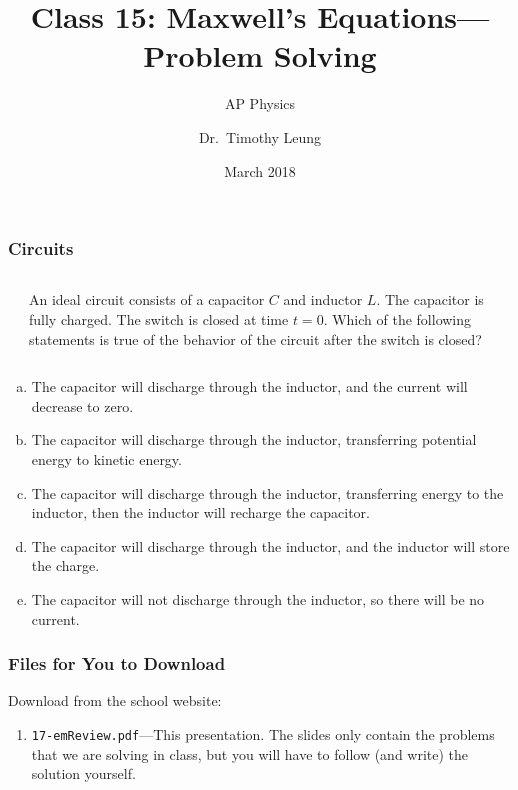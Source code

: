 \documentclass[12pt,aspectratio=169]{beamer}
\title{Class 15: Maxwell's Equations---Problem Solving}
\subtitle{AP Physics}
\author[TML]{Dr.\ Timothy Leung}
\institute{Olympiads School}
\date{March 2018}
\begin{document}
\begin{frame}
  \maketitle
\end{frame}

\begin{frame}
  \frametitle{Circuits}
  \begin{columns}
    \begin{center}
      \vspace{-.2in}
    \end{center}

    An ideal circuit consists of a capacitor $C$ and inductor $L$. The capacitor
    is fully charged. The switch is closed at time $t=0$. Which of the following
    statements is true of the behavior of the circuit after the
    switch is closed?
  \end{columns}
  \begin{enumerate}[(a)]
  \item The capacitor will discharge through the inductor, and the current will
    decrease to zero.
  \item The capacitor will discharge through the inductor, transferring
    potential energy to kinetic energy.
  \item The capacitor will discharge through the inductor, transferring energy
    to the inductor, then the inductor will recharge the capacitor.
  \item The capacitor will discharge through the inductor, and the inductor
    will store the charge.
  \item The capacitor will not discharge through the inductor, so there will be
    no current.
  \end{enumerate}
\end{frame}



\begin{frame}
  \frametitle{Files for You to Download}
  Download from the school website:
  \begin{enumerate}
  \item\texttt{17-emReview.pdf}---This presentation. The slides only
    contain the problems that we are solving in class, but you will have to
    follow (and write) the solution yourself.
  \end{enumerate}
\end{frame}
\end{document}
